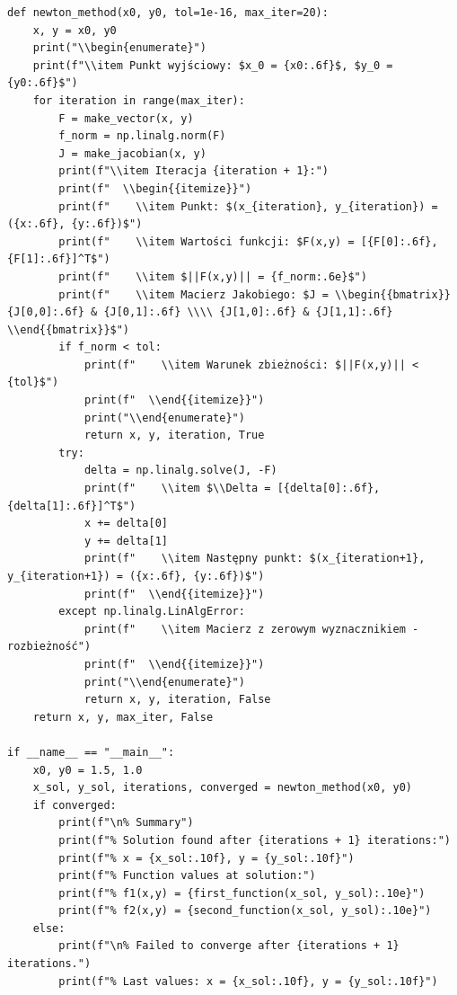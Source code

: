 \documentclass[a4paper,12pt]{article}
\begin{document}
\begin{lstlisting}
def newton_method(x0, y0, tol=1e-16, max_iter=20):
    x, y = x0, y0
    print("\\begin{enumerate}")
    print(f"\\item Punkt wyjściowy: $x_0 = {x0:.6f}$, $y_0 = {y0:.6f}$")
    for iteration in range(max_iter):
        F = make_vector(x, y)
        f_norm = np.linalg.norm(F)
        J = make_jacobian(x, y)
        print(f"\\item Iteracja {iteration + 1}:")
        print(f"  \\begin{{itemize}}")
        print(f"    \\item Punkt: $(x_{iteration}, y_{iteration}) = ({x:.6f}, {y:.6f})$")
        print(f"    \\item Wartości funkcji: $F(x,y) = [{F[0]:.6f}, {F[1]:.6f}]^T$")
        print(f"    \\item $||F(x,y)|| = {f_norm:.6e}$")
        print(f"    \\item Macierz Jakobiego: $J = \\begin{{bmatrix}} {J[0,0]:.6f} & {J[0,1]:.6f} \\\\ {J[1,0]:.6f} & {J[1,1]:.6f} \\end{{bmatrix}}$")
        if f_norm < tol:
            print(f"    \\item Warunek zbieżności: $||F(x,y)|| < {tol}$")
            print(f"  \\end{{itemize}}")
            print("\\end{enumerate}")
            return x, y, iteration, True
        try:
            delta = np.linalg.solve(J, -F)
            print(f"    \\item $\\Delta = [{delta[0]:.6f}, {delta[1]:.6f}]^T$")
            x += delta[0]
            y += delta[1]
            print(f"    \\item Następny punkt: $(x_{iteration+1}, y_{iteration+1}) = ({x:.6f}, {y:.6f})$")
            print(f"  \\end{{itemize}}")
        except np.linalg.LinAlgError:
            print(f"    \\item Macierz z zerowym wyznacznikiem - rozbieżność")
            print(f"  \\end{{itemize}}")
            print("\\end{enumerate}")
            return x, y, iteration, False
    return x, y, max_iter, False

if __name__ == "__main__":
    x0, y0 = 1.5, 1.0
    x_sol, y_sol, iterations, converged = newton_method(x0, y0)
    if converged:
        print(f"\n% Summary")
        print(f"% Solution found after {iterations + 1} iterations:")
        print(f"% x = {x_sol:.10f}, y = {y_sol:.10f}")
        print(f"% Function values at solution:")
        print(f"% f1(x,y) = {first_function(x_sol, y_sol):.10e}")
        print(f"% f2(x,y) = {second_function(x_sol, y_sol):.10e}")
    else:
        print(f"\n% Failed to converge after {iterations + 1} iterations.")
        print(f"% Last values: x = {x_sol:.10f}, y = {y_sol:.10f}")

\end{lstlisting}
\end{document}
